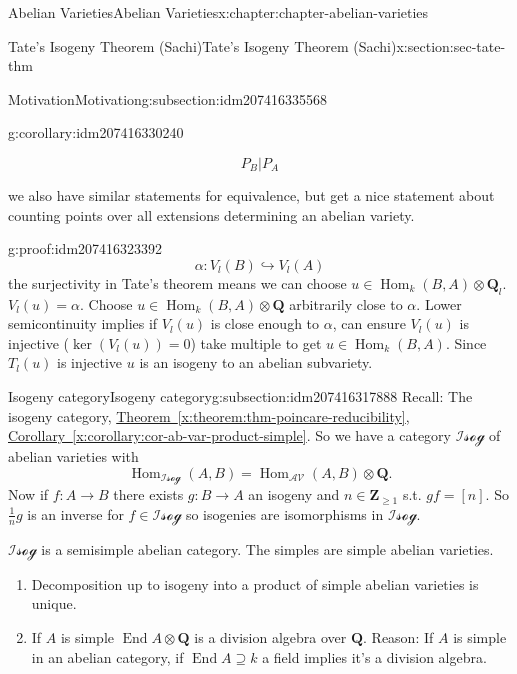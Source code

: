 \documentclass[oneside,10pt,]{book}
\numberwithin{equation}{section}
\newcommand{\lb}{[}
\newcommand{\rb}{]}
\newcommand{\ZZ}{\mathbf{Z}}
\newcommand{\QQ}{\mathbf{Q}}
\newcommand{\cat}[1]{\mathcal{#1}}
\DeclareMathOperator{\End}{End}
\DeclareMathOperator{\Hom}{Hom}
\begin{document}
\begin{chapterptx}{Abelian Varieties}{}{Abelian Varieties}{}{}{x:chapter:chapter-abelian-varieties}
\begin{sectionptx}{Tate's Isogeny Theorem (Sachi)}{}{Tate's Isogeny Theorem (Sachi)}{}{}{x:section:sec-tate-thm}
\begin{subsectionptx}{Motivation}{}{Motivation}{}{}{g:subsection:idm207416335568}
\begin{corollary}{}{}{g:corollary:idm207416330240}
\begin{enumerate}
\begin{enumerate}
\begin{equation*}
P_B | P_A
\end{equation*}
%
\end{enumerate}
%
\end{enumerate}
we also have similar statements for equivalence, but get a nice statement about counting points over all extensions determining an abelian variety.%
\end{corollary}
\begin{proofptx}{}{g:proof:idm207416323392}
%
\begin{equation*}
\alpha \colon V_l(B)\hookrightarrow V_l(A)
\end{equation*}
the surjectivity in Tate's theorem means we can choose \(u \in \Hom_k(B,A) \otimes \QQ_l\). \(V_l(u) = \alpha\). Choose \(u \in \Hom_k(B,A) \otimes \QQ\) arbitrarily close to \(\alpha\). Lower semicontinuity implies if \(V_l(u)\) is close enough to \(\alpha\), can ensure \(V_l(u)\) is injective (\(\ker (V_l (u)) = 0\)) take multiple to get \(u \in \Hom_k(B,A)\). Since \(T_l (u)\) is injective \(u \) is an isogeny to an abelian subvariety.%
\end{proofptx}
\end{subsectionptx}
%
%
\typeout{************************************************}
\typeout{************************************************}
%
\begin{subsectionptx}{Isogeny category}{}{Isogeny category}{}{}{g:subsection:idm207416317888}
Recall: The isogeny category, \hyperref[x:theorem:thm-poincare-reducibility]{Theorem~\ref{x:theorem:thm-poincare-reducibility}}, \hyperref[x:corollary:cor-ab-var-product-simple]{Corollary~\ref{x:corollary:cor-ab-var-product-simple}}. So we have  a category \(\cat{Isog}\) of abelian varieties with%
\begin{equation*}
\Hom_{\cat{Isog}}(A,B) = \Hom_\cat{AV}(A,B)\otimes \QQ\text{.}
\end{equation*}
Now if \(f \colon A \to B\) there exists \(g\colon B \to A\) an isogeny and \(n\in \ZZ_{\ge 1}\) s.t. \(gf = \lb n \rb\). So \(\frac 1n g\) is an inverse for \(f \in \cat{Isog}\) so isogenies are isomorphisms in \(\cat{Isog}\).%
\par
\(\cat{Isog}\) is a semisimple abelian category. The simples are simple abelian varieties.%
\begin{enumerate}
\item{}Decomposition up to isogeny into a product of simple abelian varieties is unique.%
\item{}If \(A\) is simple \(\End A \otimes \QQ\) is a division algebra over \(\QQ\). Reason: If \(A\) is simple in an abelian category, if \(\End A \supseteq k\) a field implies it's a division algebra.%

\end{enumerate}
\end{subsectionptx}
\end{sectionptx}
\end{chapterptx}
\end{document}

